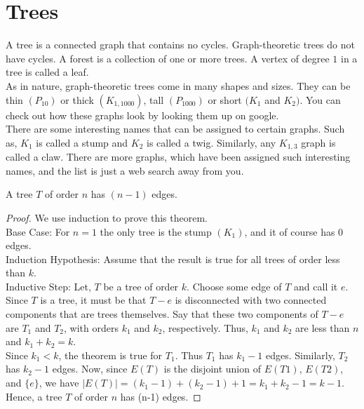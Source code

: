 \documentclass[../basic_graph_theory.tex]{subfiles}
\begin{document}
\chapter{Trees}
\setcounter{chapter}{3} %
\setcounter{section}{3}
\setcounter{equation}{3}
\setcounter{figure}{3}

A tree is a connected graph that contains no cycles. Graph-theoretic trees do not have cycles. A forest is a collection of one or more trees. A vertex of degree $1$ in a tree is called a leaf.\\
As in nature, graph-theoretic trees come in many shapes and sizes. They can be thin $(P_{10})$ or thick $(K_{1,1000})$, tall $(P_{1000})$ or short $(K_{1}$ and $K_{2})$. You can check out how these graphs look by looking them up on google.\\
There are some interesting names that can be assigned to certain graphs. Such as, $K_{1}$ is called a stump and $K_{2}$ is called a twig. Similarly, any $K_{1,3}$ graph is called a claw. There are more graphs, which have been assigned such interesting names, and the list is just a web search away from you.
\begin{thm}
    A tree $T$ of order $n$ has $(n-1)$ edges.
\end{thm}
\begin{proof}
    We use induction to prove this theorem.\\
    Base Case: For $n=1$ the only tree is the stump $(K_{1})$, and it of course has $0$ edges.\\
    Induction Hypothesis:  Assume that the result is true for all trees of order less than $k$.\\
    Inductive Step: Let, $T$ be a tree of order $k$. Choose some edge of $T$ and call it $e$. Since $T$ is a tree, it must be that $T-e$ is disconnected with two connected components that are trees themselves. Say that these two components of $T-e$ are $T_{1}$ and $T_{2}$, with orders $k_{1}$ and $k_{2}$, respectively. Thus, $k_{1}$ and $k_{2}$ are less than $n$ and $k_{1} + k_{2} = k$.\\
    Since $k_{1} < k$, the theorem is true for $T_{1}$. Thus $T_{1}$ has $k_{1}-1$ edges. Similarly, $T_{2}$ has $k_{2}-1$ edges. Now, since $E(T)$ is the disjoint union of $E(T1)$, $E(T2)$, and $\{e\}$, we have $|E(T)|=(k_{1}-1) + (k_{2}-1) + 1 = k_{1} + k_{2} - 1 = k-1$.\\
    Hence, a tree $T$ of order $n$ has (n-1) edges.
\end{proof}
\end{document}
